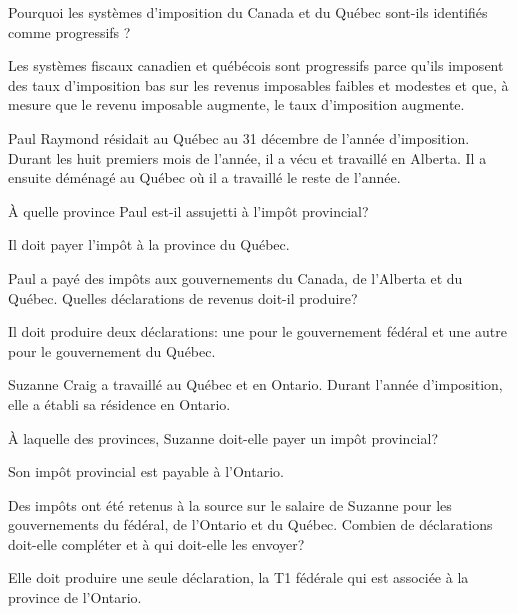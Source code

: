 \begin{question}
	Pourquoi les systèmes d'imposition du Canada et du Québec sont-ils identifiés comme \og progressifs \fg{}?
\end{question}
Les systèmes fiscaux canadien et québécois sont \og progressifs\fg{} parce qu'ils imposent des taux d'imposition bas sur les revenus imposables faibles et modestes et que, à mesure que le revenu imposable augmente, le taux d'imposition augmente.

\begin{question}
	Paul Raymond résidait au Québec au 31 décembre de l'année d'imposition. Durant les huit premiers mois de l'année, il a vécu et travaillé en Alberta. Il a ensuite déménagé au Québec où il a travaillé le reste de l'année.
\end{question}
\setcounter{sousQuestion}{0}
\begin{sousQuestion}
	À quelle province Paul est-il assujetti à l'impôt provincial?
\end{sousQuestion}
Il doit payer l'impôt à la province du Québec.
\begin{sousQuestion}
	Paul a payé des impôts aux gouvernements du Canada, de l'Alberta et du Québec. Quelles déclarations de revenus doit-il produire?
\end{sousQuestion}
Il doit produire deux déclarations: une pour le gouvernement fédéral et une autre pour le gouvernement du Québec.

\begin{question}
	Suzanne Craig a travaillé au Québec et en Ontario. Durant l'année d'imposition, elle a établi sa résidence en Ontario.
\end{question}
\setcounter{sousQuestion}{0}
\begin{sousQuestion}
	À laquelle des provinces, Suzanne doit-elle payer un impôt provincial?
\end{sousQuestion}
Son impôt provincial est payable à l'Ontario.
\begin{sousQuestion}
	Des impôts ont été retenus à la source sur le salaire de Suzanne pour les gouvernements du fédéral, de l'Ontario et du Québec. Combien de déclarations doit-elle compléter et à qui doit-elle les envoyer?
\end{sousQuestion}
Elle doit produire une seule déclaration, la T1 fédérale qui est associée à la province de l'Ontario.



